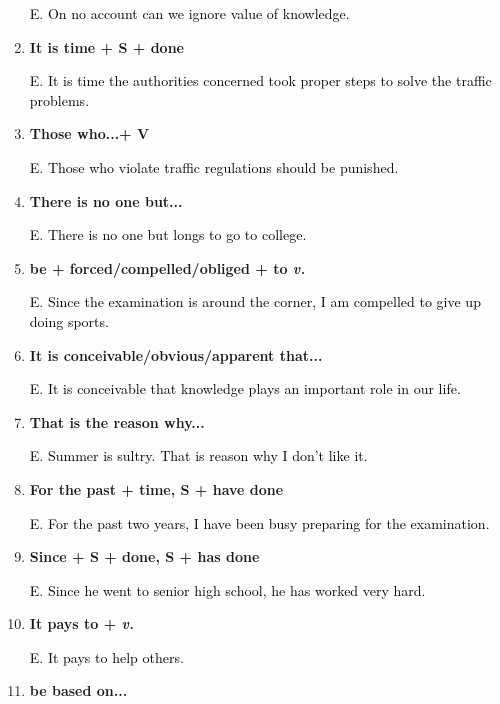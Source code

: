 \documentclass{article}
\begin{document}
\begin{enumerate}
  \textcolor{black}E. \textcolor{black}{On no account can we ignore value of knowledge.}

\item \textbf{It is time + S + done}

  \textcolor{black}E. \textcolor{black}{It is time the authorities concerned took proper
    steps to solve the traffic problems.}

\item \textbf{Those who...+ V}

  \textcolor{black}E. \textcolor{black}{Those who violate traffic regulations should be punished.}

\item \textbf{There is no one but...}

  \textcolor{black}E. \textcolor{black}{There is no one but longs to go to college.}

\item \textbf{be + forced/compelled/obliged + to \emph{v.}}

  \textcolor{black}E. \textcolor{black}{Since the examination is around the corner, I am
    compelled to give up doing sports.}

\item \textbf{It is conceivable/obvious/apparent that... }

  \textcolor{black}E. \textcolor{black}{It is conceivable that knowledge plays an
    important role in our life.}

\item \textbf{That is the reason why...}

  \textcolor{black}E. \textcolor{black}{Summer is sultry. That is reason why I don't like it.}

\item \textbf{For the past + time, S + have done}

  \textcolor{black}E. \textcolor{black}{For the past two years, I have been busy preparing
    for the examination.}

\item \textbf{Since + S + done, S + has done}

  \textcolor{black}E. \textcolor{black}{Since he went to senior high school, he has worked
    very hard.}
  
\item \textbf{It pays to + \emph{v.}}

  \textcolor{black}E. \textcolor{black}{It pays to help others.}

\item \textbf{be based on...}


\end{enumerate}
\end{document}
